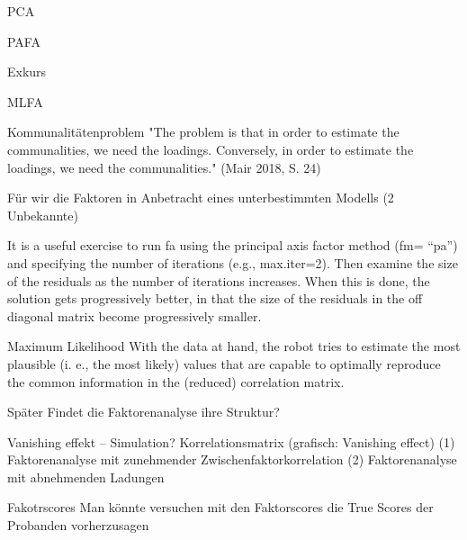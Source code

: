\documentclass[
  ignorenonframetext,
]{beamer}
\begin{document}
\begin{frame}{PCA}
\protect\hypertarget{pca}{}
\end{frame}

\begin{frame}{PAFA}
\protect\hypertarget{pafa}{}
\end{frame}

\begin{frame}{Exkurs}
\protect\hypertarget{exkurs}{}
\end{frame}

\begin{frame}{MLFA}
\protect\hypertarget{mlfa}{}
\begin{alertblock}{Kommunalitätenproblem}
  "The problem is that in order to estimate the communalities, we need the
  loadings. Conversely, in order to estimate the loadings, we need the
  communalities." (Mair 2018, S. 24)
\end{alertblock}

Für wir die Faktoren in Anbetracht eines unterbestimmten Modells (2
Unbekannte)

It is a useful exercise to run fa using the principal axis factor method
(fm= ``pa'') and specifying the number of iterations (e.g., max.iter=2).
Then examine the size of the residuals as the number of iterations
increases. When this is done, the solution gets progressively better, in
that the size of the residuals in the off diagonal matrix become
progressively smaller.
\end{frame}

\begin{frame}{Maximum Likelihood}
\protect\hypertarget{maximum-likelihood}{}
With the data at hand, the robot tries to estimate the most plausible
(i. e., the most likely) values that are capable to optimally reproduce
the common information in the (reduced) correlation matrix.
\end{frame}

\begin{frame}{Später}
\protect\hypertarget{spuxe4ter}{}
Findet die Faktorenanalyse ihre Struktur?

Vanishing effekt -- Simulation? Korrelationsmatrix (grafisch: Vanishing
effect) (1) Faktorenanalyse mit zunehmender Zwischenfaktorkorrelation
(2) Faktorenanalyse mit abnehmenden Ladungen
\end{frame}

\begin{frame}{Fakotrscores}
\protect\hypertarget{fakotrscores}{}
Man könnte versuchen mit den Faktorscores die True Scores der Probanden
vorherzusagen
\end{frame}
\end{document}
